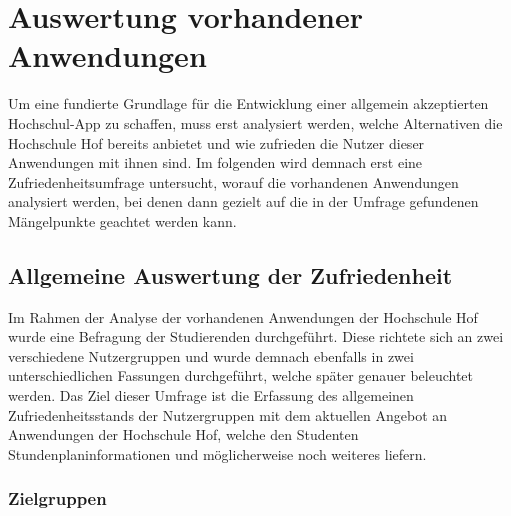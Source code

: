 \chapter{Auswertung vorhandener Anwendungen}

Um eine fundierte Grundlage für die Entwicklung einer allgemein akzeptierten Hochschul-\ac{App} zu schaffen, muss erst analysiert werden, welche Alternativen die Hochschule Hof bereits anbietet und wie zufrieden die Nutzer dieser Anwendungen mit ihnen sind. Im folgenden wird demnach erst eine Zufriedenheitsumfrage untersucht, worauf die vorhandenen Anwendungen analysiert werden, bei denen dann gezielt auf die in der Umfrage gefundenen Mängelpunkte geachtet werden kann.

\section{Allgemeine Auswertung der Zufriedenheit\label{sec:umfrage}}

Im Rahmen der Analyse der vorhandenen Anwendungen der Hochschule Hof wurde eine Befragung der Studierenden durchgeführt. Diese richtete sich an zwei verschiedene Nutzergruppen und wurde demnach ebenfalls in zwei unterschiedlichen Fassungen durchgeführt, welche später genauer beleuchtet werden. Das Ziel dieser Umfrage ist die Erfassung des allgemeinen Zufriedenheitsstands der Nutzergruppen mit dem aktuellen Angebot an Anwendungen der Hochschule Hof, welche den Studenten Stundenplaninformationen und möglicherweise noch weiteres liefern.

\subsection{Zielgruppen}
\label{umfrage_zielgruppen}

